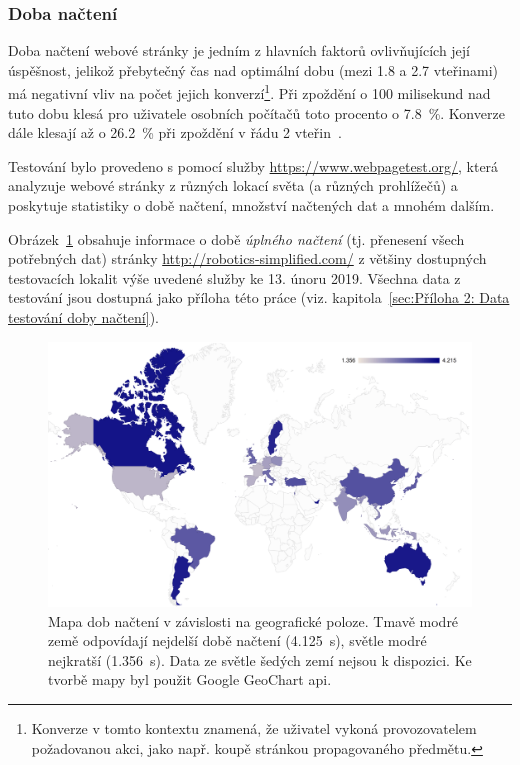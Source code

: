 \documentclass[a4paper, 12pt, twoside]{article}
\begin{document}
  \subsubsection{Doba načtení}
  Doba načtení webové stránky je jedním z hlavních faktorů ovlivňujících její úspěšnost, jelikož přebytečný čas nad optimální dobu (mezi \num{1.8} a \num{2.7} vteřinami) má negativní vliv na počet jejich konverzí\footnote{Konverze v tomto kontextu znamená, že uživatel vykoná provozovatelem požadovanou akci, jako např. koupě stránkou propagovaného předmětu.}. Při zpoždění o \num{100} milisekund nad tuto dobu klesá pro uživatele osobních počítačů toto procento o \SI{7.8}{\percent}. Konverze dále klesají až o \SI{26.2}{\percent} při zpoždění v řádu \num{2} vteřin~\cite{conversion-rate-statistics}.

  Testování bylo provedeno s pomocí služby \url{https://www.webpagetest.org/}, která analyzuje webové stránky z různých lokací světa (a různých prohlížečů) a poskytuje statistiky o době načtení, množství načtených dat a mnohém dalším.

  Obrázek~\ref{img:Mapa dob načtení v závislosti na geografické poloze} obsahuje informace o době \emph{úplného načtení} (tj. přenesení všech potřebných dat) stránky \url{http://robotics-simplified.com/} z většiny dostupných testovacích lokalit výše uvedené služby ke 13. únoru 2019. Všechna data z testování jsou dostupná jako příloha této práce (viz. kapitola~\ref{sec:Příloha 2: Data testování doby načtení}).

  \begin{figure}[H]
    \includegraphics[width=\linewidth]{map.png}
    \caption[Mapa dob načtení v závislosti na geografické poloze]{Mapa dob načtení v závislosti na geografické poloze. Tmavě modré země odpovídají nejdelší době načtení (\SI{4.125}{\second}), světle modré nejkratší (\SI{1.356}{\second}). Data ze světle šedých zemí nejsou k dispozici. Ke tvorbě mapy byl použit Google GeoChart \acrshort{api}.} \label{img:Mapa dob načtení v závislosti na geografické poloze}
  \end{figure}
\end{document}
